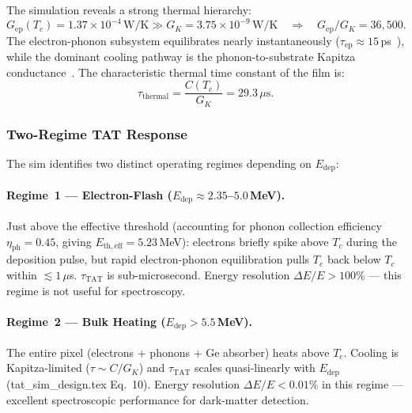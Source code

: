 The simulation reveals a strong thermal hierarchy:
\[
  G_\mathrm{ep}(T_c) = 1.37 \times 10^{-4}\,\mathrm{W/K}
  \gg G_K = 3.75 \times 10^{-9}\,\mathrm{W/K}
  \quad \Rightarrow \quad
  G_\mathrm{ep}/G_K = 36{,}500.
\]
The electron-phonon subsystem equilibrates nearly instantaneously
($\tau_\mathrm{ep} \approx 15$\,ps~\cite{Sidorova2020}), %
while the dominant cooling pathway is the phonon-to-substrate Kapitza
conductance~\cite{Swartz1989}. %
The characteristic thermal time constant of the film is:
\begin{equation}
  \tau_\mathrm{thermal} = \frac{C(T_c)}{G_K} = 29.3\,\mu\mathrm{s}.
  \label{eq:tau_thermal}
\end{equation}

\subsubsection{Two-Regime TAT Response}
\label{sec:oq5_tat_regimes}

The sim identifies two distinct operating regimes depending on $E_\mathrm{dep}$:

\paragraph{Regime~1 --- Electron-Flash ($E_\mathrm{dep} \approx 2.35$--$5.0$\,MeV).}
Just above the effective threshold (accounting for phonon collection efficiency
$\eta_\mathrm{ph} = 0.45$, giving $E_\mathrm{th,eff} = 5.23$\,MeV):
electrons briefly spike above $T_c$ during the deposition pulse, but
rapid electron-phonon equilibration pulls $T_e$ back below $T_c$ within
$\lesssim 1\,\mu$s.  $\tau_\mathrm{TAT}$ is sub-microsecond.
Energy resolution $\Delta E/E > 100\%$ --- this regime is not useful for
spectroscopy.

\paragraph{Regime~2 --- Bulk Heating ($E_\mathrm{dep} > 5.5$\,MeV).}
The entire pixel (electrons + phonons + Ge absorber) heats above $T_c$.
Cooling is Kapitza-limited ($\tau \sim C/G_K$) and $\tau_\mathrm{TAT}$
scales quasi-linearly with $E_\mathrm{dep}$ %
(tat\_sim\_design.tex Eq.~10).
Energy resolution $\Delta E / E < 0.01\%$ in this regime --- excellent
spectroscopic performance for dark-matter detection.

